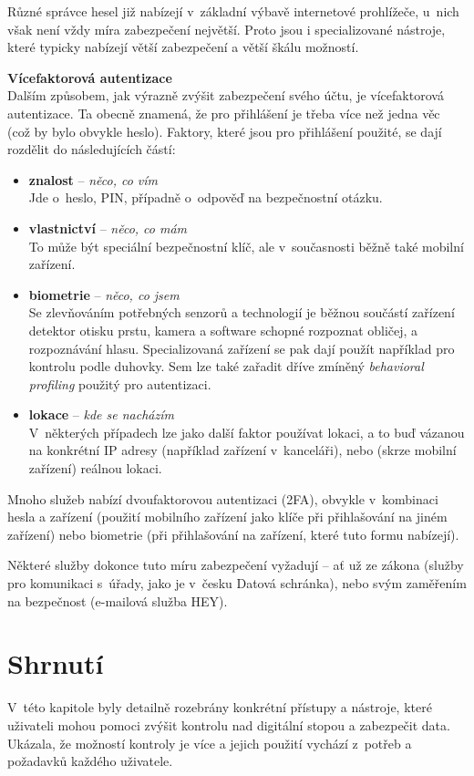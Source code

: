 Různé správce hesel již nabízejí v~základní výbavě internetové prohlížeče, u~nich však není vždy míra zabezpečení největší. Proto jsou i specializované nástroje, které typicky nabízejí větší zabezpečení a větší škálu možností.

\textbf{Vícefaktorová autentizace}\\
Dalším způsobem, jak výrazně zvýšit zabezpečení svého účtu, je vícefaktorová autentizace. Ta obecně znamená, že pro přihlášení je třeba více než jedna věc (což by bylo obvykle heslo). Faktory, které jsou pro přihlášení použité, se dají rozdělit do následujících částí:

\begin{itemize}
	\item \textbf{znalost} -- \textit{něco, co vím}\\ 
		Jde o~heslo, PIN, případně o~odpověď na bezpečnostní otázku.
	\item \textbf{vlastnictví} -- \textit{něco, co mám}\\
		To může být speciální bezpečnostní klíč, ale v~současnosti běžně také mobilní zařízení. 
	\item \textbf{biometrie} -- \textit{něco, co jsem}\\
		Se zlevňováním potřebných senzorů a technologií je běžnou součástí zařízení detektor otisku prstu, kamera a software schopné rozpoznat obličej, a rozpoznávání hlasu. Specializovaná zařízení se pak dají použít například pro kontrolu podle duhovky. Sem lze také zařadit dříve zmíněný \textit{behavioral profiling} použitý pro autentizaci.
	\item \textbf{lokace} -- \textit{kde se nacházím}\\
		V~některých případech lze jako další faktor používat lokaci, a to buď vázanou na konkrétní IP adresy (například zařízení v~kanceláři), nebo (skrze mobilní zařízení) reálnou lokaci.  
\end{itemize} 

Mnoho služeb nabízí dvoufaktorovou autentizaci (2FA), obvykle v~kombinaci hesla a zařízení (použití mobilního zařízení jako klíče při přihlašování na jiném zařízení) nebo biometrie (při přihlašování na zařízení, které tuto formu nabízejí).

Některé služby dokonce tuto míru zabezpečení vyžadují -- ať už ze zákona (služby pro komunikaci s~úřady, jako je v~česku Datová schránka), nebo svým zaměřením na  bezpečnost (e-mailová služba HEY).


\section*{Shrnutí}
V~této kapitole byly detailně rozebrány konkrétní přístupy a nástroje, které uživateli mohou pomoci zvýšit kontrolu nad digitální stopou a zabezpečit data.
Ukázala, že možností kontroly je více a jejich použití vychází z~potřeb a požadavků každého uživatele.